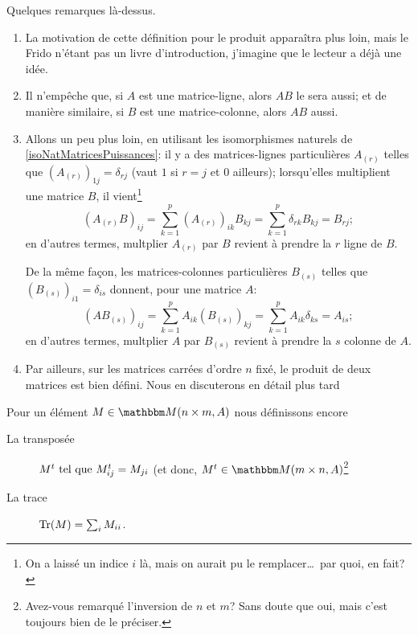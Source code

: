 \begin{remark}  \label{REM_produitMatrices}
    Quelques remarques là-dessus.
    \begin{enumerate}
        \item
            La motivation de cette définition pour le produit apparaîtra plus loin, mais le Frido n'étant pas un livre d'introduction, j'imagine que le lecteur a déjà une idée.
        \item
            Il n'empêche que, si \( A \) est une matrice-ligne, alors \( AB \) le sera aussi; et de manière similaire, si \( B \) est une matrice-colonne, alors \( AB \) aussi.
        \item   \label{REM_produitMatricesiii}
            Allons un peu plus loin, en utilisant les isomorphismes naturels de \ref{isoNatMatricesPuissances}: il y a des matrices-lignes particulières \( A_{(r)} \) telles que \( (A_{(r)})_{1j} = \delta_{rj} \) (vaut \( 1 \) si \( r = j \) et \( 0 \) ailleurs); lorsqu'elles multiplient une matrice \( B \), il vient\footnote{On a laissé un indice \( i \) là, mais on aurait pu le remplacer\dots\ par quoi, en fait?}
            \begin{equation}
            (A_{(r)}B)_{ij} = \sum_{k=1}^p(A_{(r)})_{ik}B_{kj} = \sum_{k=1}^p \delta_{rk} B_{kj} = B_{rj};
            \end{equation}
            en d'autres termes, multplier \( A_{(r)} \) par \( B \) revient à prendre la \( r \)\ieme{} ligne de \( B \).
            
            De la même façon, les matrices-colonnes particulières \( B_{(s)} \) telles que \( (B_{(s)})_{i1} = \delta_{is} \) donnent, pour une matrice \( A \): \begin{equation}
            (AB_{(s)})_{ij} = \sum_{k=1}^pA_{ik}(B_{(s)})_{kj} = \sum_{k=1}^p A_{ik} \delta_{ks} = A_{is};
            \end{equation}
            en d'autres termes, multplier \( A \) par \( B_{(s)} \) revient à prendre la \( s \)\ieme{} colonne de \( A \).
        \item
            Par ailleurs, sur les matrices carrées d'ordre \( n \) fixé, le produit de deux matrices est bien défini. Nous en discuterons en détail plus tard
    \end{enumerate}
\end{remark}

\begin{definition}
    Pour un élément \( M\in \eM(n\times m, A)\) nous définissons encore
    \begin{description}
        \item[La transposée] \( M^t \text{ tel que } M^t_{ij}=M_{ji}\) (et donc, \( M^t\in \eM(m\times n, A)\)\footnote{Avez-vous remarqué l'inversion de \( n \) et \( m \)? Sans doute que oui, mais c'est toujours bien de le préciser.}
        \item[La trace] \( \operatorname{Tr}(M)=\sum_i M_{ii}\). 
    \end{description}
\end{definition}

